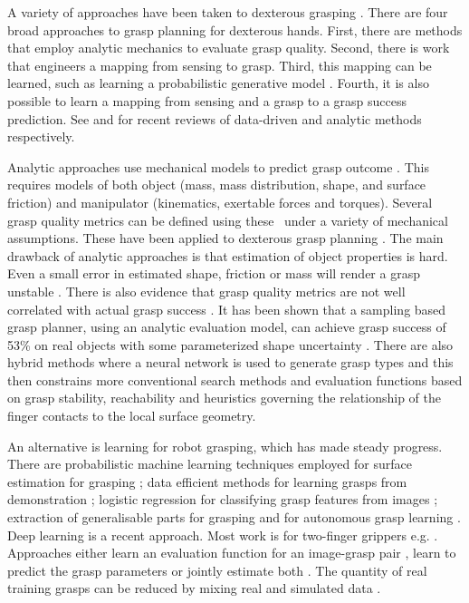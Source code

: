 A variety of approaches have been taken to dexterous grasping \cite{bicchi2000a,miller2004,ciocarlie2009hand,detry2010a,varley2015generating,kopicki2015ijrr,Hua2016,Alo2016,Kanoulas2017,Cao2021}. There are four broad approaches to grasp planning for dexterous hands. First, there are methods that employ analytic mechanics to evaluate grasp quality. Second, there is work that engineers a mapping from sensing to grasp. Third, this mapping can be learned, such as learning a probabilistic generative model \cite{bishop_pattern_2006}. Fourth, it is also possible to learn a mapping from sensing and a grasp to a grasp success prediction. See \cite{bohg2014data} and  \cite{sahbani2012overview} for recent reviews of data-driven and analytic methods respectively.

Analytic approaches use mechanical models to predict grasp outcome \cite{bicchi2000a,Liu2000,Pollard2004,miller2004}. This requires models of both object (mass, mass distribution, shape, and surface friction) and manipulator (kinematics, exertable forces and torques). Several grasp quality metrics can be defined using these~\cite{Ferrari1992,Roa2015,Shimoga1996} under a variety of mechanical assumptions. These have been applied to dexterous grasp planning \cite{Boutselis2014,Gori2014,Hang2014,Rosales2012,Saut2012,ciocarlie2009hand}. The main drawback of analytic approaches is that estimation of object properties is hard. Even a small error in estimated shape, friction or mass will render a grasp unstable \cite{zheng2005a}. There is also evidence that grasp quality metrics are not well correlated with actual grasp success \cite{bekiroglu2011b,kim2013a,goins2014a}. It has been shown that a sampling based grasp planner, using an analytic evaluation model, can achieve grasp success of 53\% on real objects with some parameterized shape uncertainty \cite{li2016dexterous}. There are also hybrid methods \cite{Deng2021} where a neural network is used to generate grasp types and this then constrains more conventional search methods and evaluation functions based on grasp stability, reachability and heuristics governing the relationship of the finger contacts to the local surface geometry.

An alternative is learning for robot grasping, which has made steady progress. There are probabilistic machine learning techniques employed for surface estimation for grasping \cite{dragiev2011gaussian}; data efficient methods for learning grasps from demonstration \cite{ben-amor2012a,kopicki2015ijrr,Osa2018}; logistic regression for classifying grasp features from images \cite{saxena2008a}; extraction of generalisable parts for grasping \cite{detry2012a} and for autonomous grasp learning \cite{detry2010a}. Deep learning is a recent approach. Most work is for two-finger grippers e.g. \cite{songiros20}. Approaches either learn an evaluation function for an image-grasp pair \cite{levine16,lenz2015deep,gualtieri2016high,mahler2017dex,pinto2016supersizing,johns2016deep}, learn to predict the grasp parameters \cite{redmon2015real,kumra2017iros} or jointly estimate both \cite{morrison18}. The quantity of real training grasps can be reduced by mixing real and simulated data \cite{bousmalis2017using}. 



